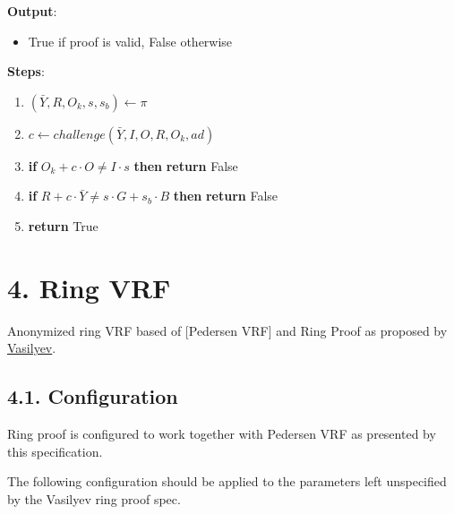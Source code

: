 \documentclass[
]{article}
\providecommand{\tightlist}{%
  \setlength{\itemsep}{0pt}\setlength{\parskip}{0pt}}
\begin{document}
\textbf{Output}:

\begin{itemize}
\tightlist
\item
  True if proof is valid, False otherwise
\end{itemize}

\textbf{Steps}:

\begin{enumerate}
\def\labelenumi{\arabic{enumi}.}
\tightlist
\item
  \((\bar{Y}, R, O_k, s, s_b) \leftarrow \pi\)
\item
  \(c \leftarrow challenge(\bar{Y}, I, O, R, O_k, ad)\)
\item
  \textbf{if} \(O_k + c \cdot O \neq I \cdot s\) \textbf{then}
  \textbf{return} False
\item
  \textbf{if} \(R + c \cdot \bar{Y} \neq s \cdot G + s_b \cdot B\)
  \textbf{then} \textbf{return} False
\item
  \textbf{return} True
\end{enumerate}

\hypertarget{ring-vrf}{%
\section{4. Ring VRF}\label{ring-vrf}}

Anonymized ring VRF based of {[}Pedersen VRF{]} and Ring Proof as
proposed by \href{https://hackmd.io/ulW5nFFpTwClHsD0kusJAA}{Vasilyev}.

\hypertarget{configuration-2}{%
\subsection{4.1. Configuration}\label{configuration-2}}

Ring proof is configured to work together with Pedersen VRF as presented
by this specification.

The following configuration should be applied to the parameters left
unspecified by the Vasilyev ring proof spec.
\end{document}
